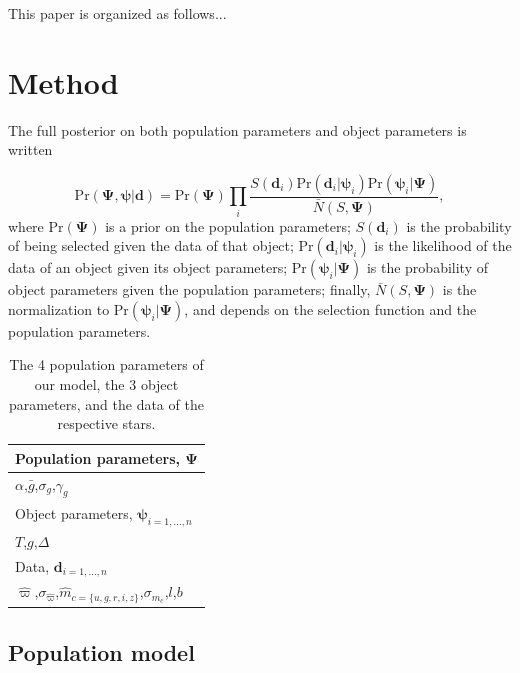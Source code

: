 \documentclass[fleqn,usenatbib]{mnras}
\newcommand{\popp}{\boldsymbol{\Psi}}
\newcommand{\objp}{\boldsymbol{\psi}}
\newcommand{\data}{\mathbf{d}}
\newcommand{\Teff}{T}
\newcommand{\logg}{g}
\newcommand{\pr}{\text{Pr}}
\begin{document}
This paper is organized as follows...



\section{Method}\label{sec:method}

The full posterior on both population parameters and object parameters is written

\begin{equation}\label{eq:fullposterior}
	\pr(\popp,\objp | \data ) = \pr(\popp)
    \prod_i \frac{S(\data_i) \pr(\data_i|\objp_i) \pr(\objp_i | \popp)}{\bar{N}(S,\popp)},
\end{equation}
where $\pr(\popp)$ is a prior on the population parameters; $S(\data_i)$ is the probability of being selected given the data of that object; $\pr(\data_i|\objp_i)$ is the likelihood of the data of an object given its object parameters; $\pr(\objp_i | \popp)$ is the probability of object parameters given the population parameters; finally, $\bar{N}(S,\popp)$ is the normalization to $\pr(\objp_i | \popp)$, and depends on the selection function and the population parameters.



\begin{table}
	\centering
	\caption{The 4 population parameters of our model, the 3 object parameters, and the data of the respective stars.}
	\label{tab:parameters}
    \begin{tabular}{l}
		\hline
		Population parameters, $\popp$ \\
		\hline
		$\alpha$,\quad $\bar{g}$,\quad $\sigma_g$,\quad $\gamma_g$ \\
        \hline
        Object parameters, $\objp_{i=1,...,n}$ \\
        \hline
        $\Teff$,\quad $\logg$,\quad $\Delta$ \\
        \hline
        Data, $\data_{i=1,...,n}$ \\
        \hline
        $\hat{\varpi}$,\quad $\sigma_{\hat{\varpi}}$,\quad $\hat{m}_{c=\{u,g,r,i,z\}}$,\quad $\sigma_{\hat{m}_c}$,\quad $l$,\quad $b$ \\
		\hline
	\end{tabular}
\end{table}

\subsection{Population model}\label{sec:populationmodel}
\end{document}
